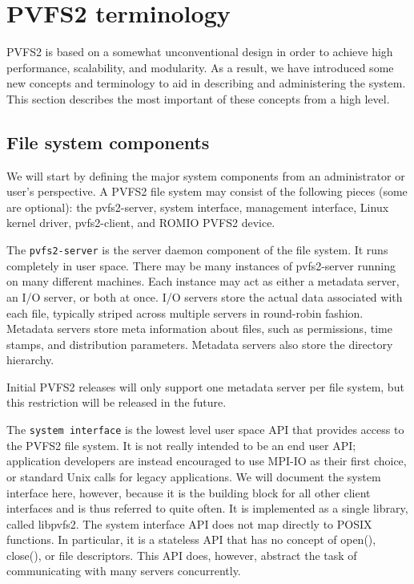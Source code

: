 \section{PVFS2 terminology}

PVFS2 is based on a somewhat unconventional design in order to achieve 
high performance, scalability, and modularity.  As a result, we have 
introduced some new concepts and terminology to aid in describing and
administering the system.  This section describes the most important
of these concepts from a high level.

\subsection{File system components}

We will start by defining the major system components from an administrator
or user's perspective.  A PVFS2 file system may consist of the following
pieces (some are optional): the pvfs2-server, system interface, management
interface, Linux kernel driver, pvfs2-client, and ROMIO PVFS2 device.

The \texttt{pvfs2-server} is the server daemon component of the file
system.  It runs completely in user space.  There may be many instances
of pvfs2-server running on many different machines.  Each instance may
act as either a metadata server, an I/O server, or both at once.
I/O servers store the actual data associated with each file, typically
striped across multiple servers in round-robin fashion.  Metadata servers
store meta information about files, such as permissions, time stamps,
and distribution parameters.  Metadata servers also store the directory
hierarchy.

Initial PVFS2 releases will only support one metadata server per file system,
but this restriction will be released in the future.

The \texttt{system interface} is the lowest level user space API that 
provides access to the PVFS2 file system.  It is not really intended to
be an end user API; application developers are instead encouraged to use
MPI-IO as their first choice, or standard Unix calls for legacy applications.
We will document the system interface here, however, because it is the
building block for all other client interfaces and is thus referred to
quite often.  It is implemented as a single library, called libpvfs2.  
The system interface API does not map directly to POSIX functions.  In 
particular, it is a stateless API that has no concept of open(), close(),
or file descriptors.  This API does, however, abstract the task of 
communicating with many servers concurrently.

